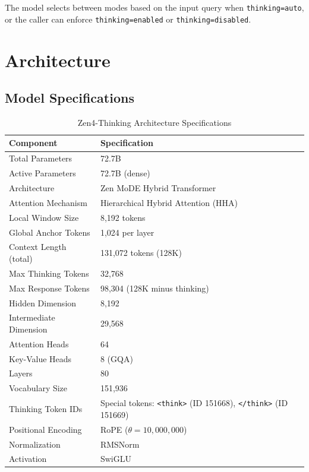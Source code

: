 \documentclass[11pt,a4paper]{article}
\begin{document}
The model selects between modes based on the input query when \texttt{thinking=auto},
or the caller can enforce \texttt{thinking=enabled} or \texttt{thinking=disabled}.

\section{Architecture}

\subsection{Model Specifications}

\begin{table}[H]
\centering
\begin{tabular}{ll}
\toprule
\textbf{Component} & \textbf{Specification} \\
\midrule
Total Parameters          & 72.7B \\
Active Parameters         & 72.7B (dense) \\
Architecture              & Zen MoDE Hybrid Transformer \\
Attention Mechanism       & Hierarchical Hybrid Attention (HHA) \\
Local Window Size         & 8,192 tokens \\
Global Anchor Tokens      & 1,024 per layer \\
Context Length (total)    & 131,072 tokens (128K) \\
Max Thinking Tokens       & 32,768 \\
Max Response Tokens       & 98,304 (128K minus thinking) \\
Hidden Dimension          & 8,192 \\
Intermediate Dimension    & 29,568 \\
Attention Heads           & 64 \\
Key-Value Heads           & 8 (GQA) \\
Layers                    & 80 \\
Vocabulary Size           & 151,936 \\
Thinking Token IDs        & Special tokens: \texttt{<think>} (ID 151668), \texttt{</think>} (ID 151669) \\
Positional Encoding       & RoPE ($\theta = 10{,}000{,}000$) \\
Normalization             & RMSNorm \\
Activation                & SwiGLU \\
\bottomrule
\end{tabular}
\caption{Zen4-Thinking Architecture Specifications}
\end{table}
\end{document}
